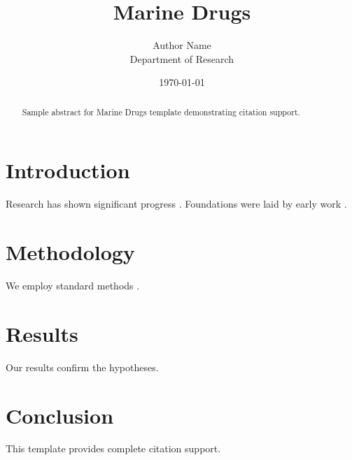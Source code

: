 \documentclass{mdpi}
\title{Marine Drugs}
\author{Author Name \\ \small Department of Research}
\date{\today}
\begin{document}
\maketitle

\begin{abstract}
Sample abstract for Marine Drugs template demonstrating citation support.
\end{abstract}

\section{Introduction}
Research has shown significant progress \citep{einstein1905}. Foundations were laid by early work \citep{turing1950}.

\section{Methodology}
We employ standard methods \citep{knuth1984}.

\section{Results}
Our results confirm the hypotheses.

\section{Conclusion}
This template provides complete citation support.



\end{document}
